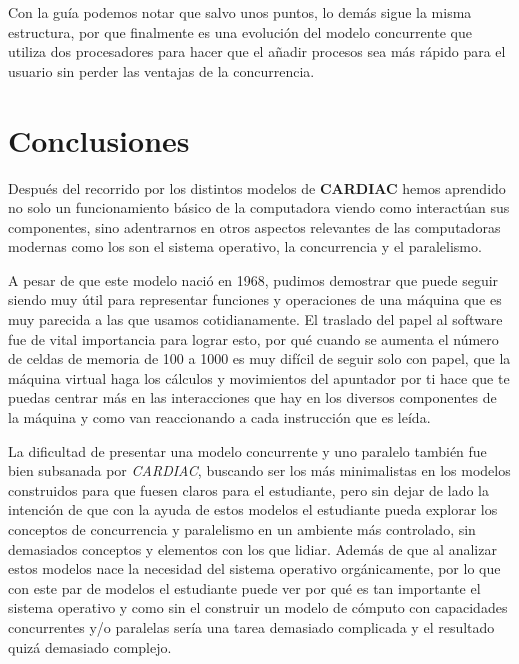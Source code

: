 \documentclass[letterpaper,12pt,oneside]{book}
\begin{document}
			
			Con la guía podemos notar que salvo unos puntos, lo demás sigue la misma estructura, por que finalmente es una evolución
			del modelo concurrente que utiliza dos procesadores para hacer que el añadir procesos sea más rápido para el usuario sin
			perder las ventajas de la concurrencia.

\chapter{Conclusiones}


			Después del recorrido por los distintos modelos de \textbf{CARDIAC} hemos aprendido no solo un funcionamiento básico de la computadora
			viendo como interactúan sus componentes, sino adentrarnos en otros aspectos relevantes de las computadoras modernas como los son
			el sistema operativo, la concurrencia y el paralelismo.
			
			A pesar de que este modelo nació en 1968, pudimos demostrar que puede
			seguir siendo muy útil para representar funciones y operaciones de una máquina que es muy parecida a las que usamos
			cotidianamente. El traslado del papel al software fue de vital importancia para lograr esto, por qué cuando se aumenta
			el número de celdas de memoria de 100 a 1000 es muy difícil de seguir solo con papel, que la máquina virtual haga los
			cálculos y movimientos del apuntador por ti hace que te puedas centrar más en las interacciones que hay en los diversos componentes de la 
			máquina y como
			van reaccionando a cada instrucción que es leída.
			
			La dificultad de presentar una modelo concurrente y uno paralelo también fue bien subsanada por \textit{CARDIAC}, buscando ser
			los más minimalistas en los modelos construidos para que fuesen claros para el estudiante, pero sin dejar de lado la intención
			de que con la ayuda de estos modelos el estudiante pueda explorar los conceptos de concurrencia y paralelismo en un ambiente
			más controlado, sin demasiados conceptos y elementos con los que lidiar. Además de que al analizar estos modelos
			nace la necesidad del sistema operativo orgánicamente, por lo que con este par de modelos el estudiante puede ver
			por qué es tan importante el sistema operativo y como sin el construir un modelo de cómputo con capacidades concurrentes y/o paralelas
			sería una tarea demasiado complicada y el resultado quizá demasiado complejo.
			
\end{document}

